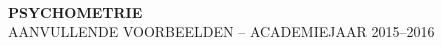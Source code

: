 \documentclass[a4paper]{article}
\begin{document}
\mbox{}\vspace*{-2cm}
\begin{center}
  \hrulefill\\
  {\bfseries PSYCHOMETRIE}\\
  AANVULLENDE VOORBEELDEN -- ACADEMIEJAAR 2015--2016\\
  \hrulefill\\
\end{center}

\end{document}
